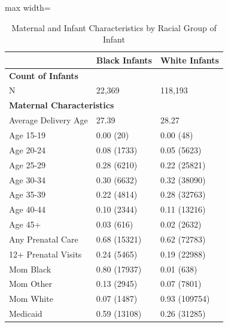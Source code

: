 \begin{table}[ht]
\centering
\caption{Maternal and Infant Characteristics by Racial Group of Infant}
\label{tab:summary_table}
\begin{adjustbox}{max width=\textwidth}
\begin{tabular}{lll}
\toprule
& \textbf{Black Infants} & \textbf{White Infants} \\
\midrule
\multicolumn{3}{l}{\textbf{Count of Infants}} \\
\hspace{1em} N & 22,369 & 118,193 \\
\multicolumn{3}{l}{\textbf{Maternal Characteristics}} \\
\hspace{1em} Average Delivery Age & 27.39 & 28.27  \\
\hspace{1em}Age 15-19 & 0.00 (20) & 0.00 (48) \\
\hspace{1em}Age 20-24 & 0.08 (1733) & 0.05 (5623) \\
\hspace{1em}Age 25-29 & 0.28 (6210) & 0.22 (25821) \\
\hspace{1em}Age 30-34 & 0.30 (6632) & 0.32 (38090) \\
\hspace{1em}Age 35-39 & 0.22 (4814) & 0.28 (32763) \\
\hspace{1em}Age 40-44 & 0.10 (2344) & 0.11 (13216) \\
\hspace{1em}Age 45+ & 0.03 (616) & 0.02 (2632) \\
\hspace{1em}Any Prenatal Care & 0.68 (15321) & 0.62 (72783) \\
\hspace{1em}12+ Prenatal Visits & 0.24 (5465) & 0.19 (22988) \\
\hspace{1em}Mom Black & 0.80 (17937) & 0.01 (638) \\
\hspace{1em}Mom Other & 0.13 (2945) & 0.07 (7801) \\
\hspace{1em}Mom White & 0.07 (1487) & 0.93 (109754) \\
\hspace{1em}Medicaid & 0.59 (13108) & 0.26 (31285) \\

\end{tabular}
\end{adjustbox}
\end{table}
